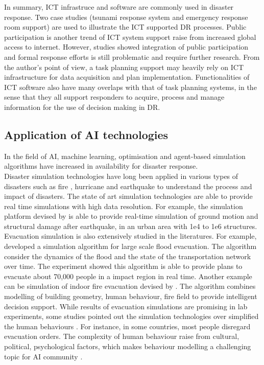 In summary, \ac{ICT} infrastruce and software are commonly used in disaster response. Two case studies (tsunami response system and emergency response room support) are used to illustrate the \ac{ICT} supported DR processes. Public participation is another trend of \ac{ICT} system support raise from increased global access to internet. However, studies showed integration of public participation and formal response efforts is still problematic and require further research. From the author's point of view, a task planning support may heavily rely on \ac{ICT} infrastructure for data acquisition and plan implementation. Functionalities of \ac{ICT} software also have many overlaps with that of task planning systems, in the sense that they all support responders to acquire, process and manage information for the use of decision making in \ac{DR}. \\


\subsection{Application of AI technologies}\label{sec:lraisupport}
In the field of \ac{AI}, machine learning, optimisation and agent-based simulation algorithms have increased in availability for disaster response. \\

Disaster simulation technologies \cite{Okaya,Scerri2005} have long been applied in various types of disasters such as fire \cite{Tang2012}, hurricane \cite{Vickery2009} and earthquake\cite{Sobhaninejad2011} to understand the process and impact of disasters. The state of art simulation technologies are able to provide real time simulations with high data resolution. For example, the simulation platform devised by \cite{Sobhaninejad2011} is able to provide real-time simulation of ground motion and structural damage after earthquake, in an urban area with {1e4} to {1e6} structures. \\

Evacuation simulation is also extensively studied in the literatures. For example, \cite{Pillac2015} developed a simulation algorithm for large scale flood evacuation. The algorithm consider the dynamics of the flood and the state of the transportation network over time. The experiment showed this algorithm is able to provide plans to evacuate about 70,000 people in a impact region in real time.  Another example can be simulation of indoor fire evacuation devised by \cite{Tang2012}.  The algorithm combines modelling of building geometry, human behaviour, fire field to provide intelligent decision support. While results of evacuation simulations are promising in lab experiments, some studies pointed out the simulation technologies over simplified the human behaviours \cite{Hentenryck2011}. For instance, in some countries, most people disregard evacuation orders. The complexity of human behaviour raise from cultural, political, psychological factors, which makes behaviour modelling a challenging topic for \ac{AI} community \cite{Provitolo2011} . \\

